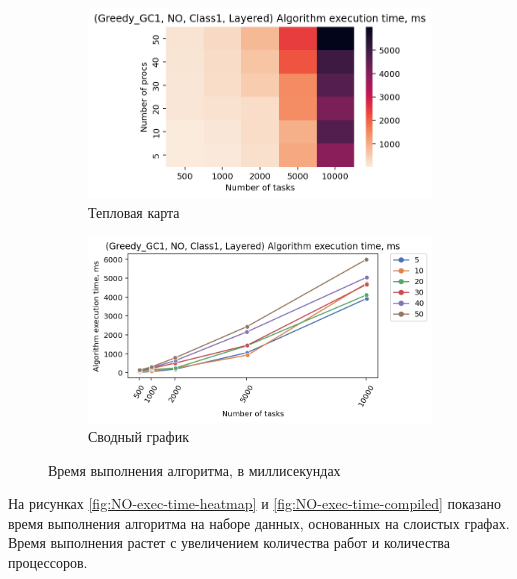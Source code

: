 \begin{figure}[!htbp]
    \centering
    \begin{subfigure}{0.49\textwidth}
        \includegraphics[width=\textwidth]{imgs/layered_class_1/NO/et_heatmap.png}
        \caption{Тепловая карта}
        \label{fig:NO-layered-exec-time-heatmap}
    \end{subfigure}
    \hfill
    \begin{subfigure}{0.49\textwidth}
        \includegraphics[width=\textwidth]{imgs/layered_class_1/NO/tr_graph.png}
        \caption{Сводный график}
        \label{fig:NO-layered-exec-time-compiled}
    \end{subfigure}
    \caption{Время выполнения алгоритма, в миллисекундах}
\end{figure}

На рисунках \ref{fig:NO-exec-time-heatmap} и \ref{fig:NO-exec-time-compiled} показано время выполнения алгоритма на наборе данных, основанных на слоистых графах. Время выполнения растет с увеличением количества работ и количества процессоров.

